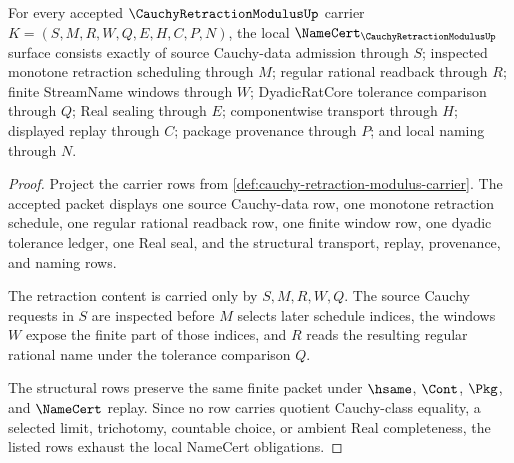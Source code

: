 \begin{theorem}
\label{thm:cauchy-retraction-modulus-namecert-obligations}
For every accepted $\CauchyRetractionModulusUp$ carrier $K=(S,M,R,W,Q,E,H,C,P,N)$, the local $\NameCert_{\CauchyRetractionModulusUp}$ surface consists exactly of source Cauchy-data admission through $S$; inspected monotone retraction scheduling through $M$; regular rational readback through $R$; finite StreamName windows through $W$; DyadicRatCore tolerance comparison through $Q$; Real sealing through $E$; componentwise transport through $H$; displayed replay through $C$; package provenance through $P$; and local naming through $N$.
\end{theorem}
\begin{proof}
Project the carrier rows from \autoref{def:cauchy-retraction-modulus-carrier}. The accepted packet displays one source Cauchy-data row, one monotone retraction schedule, one regular rational readback row, one finite window row, one dyadic tolerance ledger, one Real seal, and the structural transport, replay, provenance, and naming rows.

The retraction content is carried only by $S,M,R,W,Q$. The source Cauchy requests in $S$ are inspected before $M$ selects later schedule indices, the windows $W$ expose the finite part of those indices, and $R$ reads the resulting regular rational name under the tolerance comparison $Q$.

The structural rows preserve the same finite packet under $\hsame$, $\Cont$, $\Pkg$, and $\NameCert$ replay. Since no row carries quotient Cauchy-class equality, a selected limit, trichotomy, countable choice, or ambient Real completeness, the listed rows exhaust the local NameCert obligations.
\end{proof}

